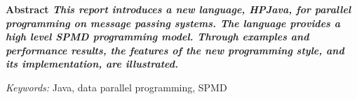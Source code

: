 
\noindent
{\bf Abstract
{\small\em
This report introduces a new language, \emph{HPJava}, for parallel
programming on message passing systems.  The language provides
a high level SPMD programming model.  Through examples and performance
results, the features of the new programming style, and
its implementation, are illustrated.
}
}

\vspace{0.5cm}

\noindent
{\it Keywords:}
{\small Java, data parallel programming, SPMD}

